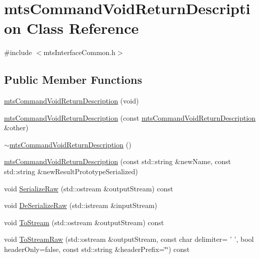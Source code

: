 \hypertarget{classmts_command_void_return_description}{\section{mts\-Command\-Void\-Return\-Description Class Reference}
\label{classmts_command_void_return_description}
}


{\ttfamily \#include $<$mts\-Interface\-Common.\-h$>$}

\subsection*{Public Member Functions}
\begin{DoxyCompactItemize}
\item 
\hyperlink{classmts_command_void_return_description_a5e553b0b76c89ae551b4be9a4ff587c2}{mts\-Command\-Void\-Return\-Description} (void)
\item 
\hyperlink{classmts_command_void_return_description_a5dd8fb7683018b87984f0fe233941867}{mts\-Command\-Void\-Return\-Description} (const \hyperlink{classmts_command_void_return_description}{mts\-Command\-Void\-Return\-Description} \&other)
\item 
\hyperlink{classmts_command_void_return_description_a2e610f6878953b416009818393211eb5}{$\sim$mts\-Command\-Void\-Return\-Description} ()
\item 
\hyperlink{classmts_command_void_return_description_ac78bfee8a6f6efb9bb5db8666815c06c}{mts\-Command\-Void\-Return\-Description} (const std\-::string \&new\-Name, const std\-::string \&new\-Result\-Prototype\-Serialized)
\item 
void \hyperlink{classmts_command_void_return_description_a813973766ca559b195e685686cd52540}{Serialize\-Raw} (std\-::ostream \&output\-Stream) const 
\item 
void \hyperlink{classmts_command_void_return_description_a3ea55edb4e0b1ee6770c0d95bda223c6}{De\-Serialize\-Raw} (std\-::istream \&input\-Stream)
\item 
void \hyperlink{classmts_command_void_return_description_ac7674aef35d30359cd31b89bb4f3b565}{To\-Stream} (std\-::ostream \&output\-Stream) const 
\item 
void \hyperlink{classmts_command_void_return_description_aa1a66f295c20ba07e2a0fb5422e3f1ea}{To\-Stream\-Raw} (std\-::ostream \&output\-Stream, const char delimiter= ' ', bool header\-Only=false, const std\-::string \&header\-Prefix=\char`\"{}\char`\"{}) const 

\end{DoxyCompactItemize}
